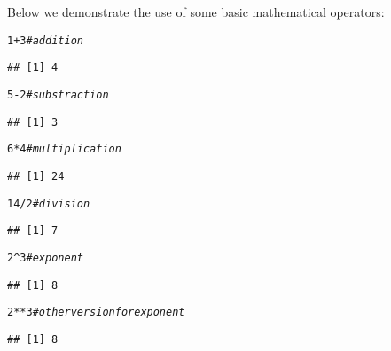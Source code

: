 \documentclass[12pt,a4paper]{scrartcl}\usepackage[]{graphicx}\usepackage[]{color}
\makeatletter
\newcommand{\hlnum}[1]{\textcolor[rgb]{0.686,0.059,0.569}{#1}}%
\newcommand{\hlcom}[1]{\textcolor[rgb]{0.678,0.584,0.686}{\textit{#1}}}%
\newcommand{\hlopt}[1]{\textcolor[rgb]{0,0,0}{#1}}%
\newenvironment{kframe}{%
 \def\at@end@of@kframe{}%
 \ifinner\ifhmode%
  \def\at@end@of@kframe{\end{minipage}}%
  \begin{minipage}{\columnwidth}%
 \fi\fi%
 \def\FrameCommand##1{\hskip\@totalleftmargin \hskip-\fboxsep
 \colorbox{shadecolor}{##1}\hskip-\fboxsep
     \hskip-\linewidth \hskip-\@totalleftmargin \hskip\columnwidth}%
 \MakeFramed {\advance\hsize-\width
   \@totalleftmargin\z@ \linewidth\hsize
   \@setminipage}}%
 {\par\unskip\endMakeFramed%
 \at@end@of@kframe}
\newenvironment{knitrout}{}{} %
\makeatother
\begin{document}
Below we demonstrate the use of some basic mathematical operators:
\begin{knitrout}
\color{fgcolor}\begin{kframe}
\begin{alltt}
\hlnum{1}\hlopt{+}\hlnum{3} \hlcom{#addition}
\end{alltt}
\begin{verbatim}
## [1] 4
\end{verbatim}
\begin{alltt}
\hlnum{5}\hlopt{-}\hlnum{2} \hlcom{#substraction}
\end{alltt}
\begin{verbatim}
## [1] 3
\end{verbatim}
\begin{alltt}
\hlnum{6}\hlopt{*}\hlnum{4} \hlcom{#multiplication}
\end{alltt}
\begin{verbatim}
## [1] 24
\end{verbatim}
\begin{alltt}
\hlnum{14}\hlopt{/}\hlnum{2} \hlcom{#division}
\end{alltt}
\begin{verbatim}
## [1] 7
\end{verbatim}
\begin{alltt}
\hlnum{2}\hlopt{^}\hlnum{3} \hlcom{#exponent}
\end{alltt}
\begin{verbatim}
## [1] 8
\end{verbatim}
\begin{alltt}
\hlnum{2}\hlopt{**}\hlnum{3} \hlcom{#other version for exponent}
\end{alltt}
\begin{verbatim}
## [1] 8
\end{verbatim}
\end{kframe}
\end{knitrout}
\end{document}
